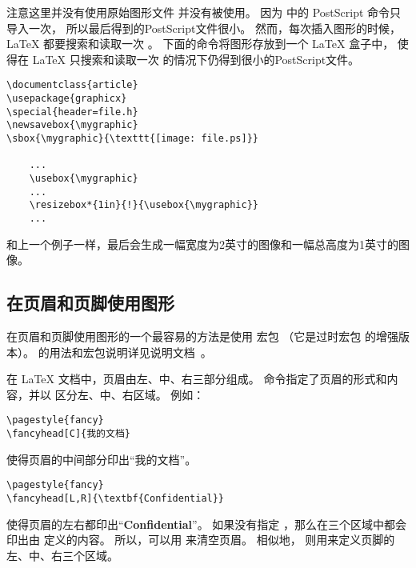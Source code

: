 注意这里并没有使用原始图形文件  并没有被使用。
因为  中的 PostScript 命令只导入一次，
所以最后得到的PostScript文件很小。
然而，每次插入图形的时候，\LaTeX{} 都要搜索和读取一次 。
下面的命令将图形存放到一个 \LaTeX{} 盒子中，
使得在 \LaTeX{} 只搜索和读取一次  的情况下仍得到很小的PostScript文件。
\begin{lstlisting}[xleftmargin=1cm]
\documentclass{article}
\usepackage{graphicx}
\special{header=file.h}
\newsavebox{\mygraphic}
\sbox{\mygraphic}{\texttt{[image: file.ps]}}

	...
	\usebox{\mygraphic}
	...
	\resizebox*{1in}{!}{\usebox{\mygraphic}}
	...

\end{lstlisting}
和上一个例子一样，最后会生成一幅宽度为2英寸的图像和一幅总高度为1英寸的图像。


\subsection{在页眉和页脚使用图形}\label{ssec:headgraph}

在页眉和页脚使用图形的一个最容易的方法是使用  宏包
（它是过时宏包  的增强版本）。
 的用法和宏包说明详见说明文档~\cite{fancyhdr-doc}。

在 \LaTeX{} 文档中，页眉由左、中、右三部分组成。
 命令指定了页眉的形式和内容，并以  区分左、中、右区域。
例如：
\begin{Verbatim}[xleftmargin=1cm]
\pagestyle{fancy}
\fancyhead[C]{我的文档}
\end{Verbatim}
使得页眉的中间部分印出“我的文档”。
\begin{Verbatim}[xleftmargin=1cm]
\pagestyle{fancy}
\fancyhead[L,R]{\textbf{Confidential}}
\end{Verbatim}
使得页眉的左右都印出“\textbf{Confidential}”。
如果没有指定 ，那么在三个区域中都会印出由  定义的内容。
所以，可以用  来清空页眉。 
相似地， 则用来定义页脚的左、中、右三个区域。


